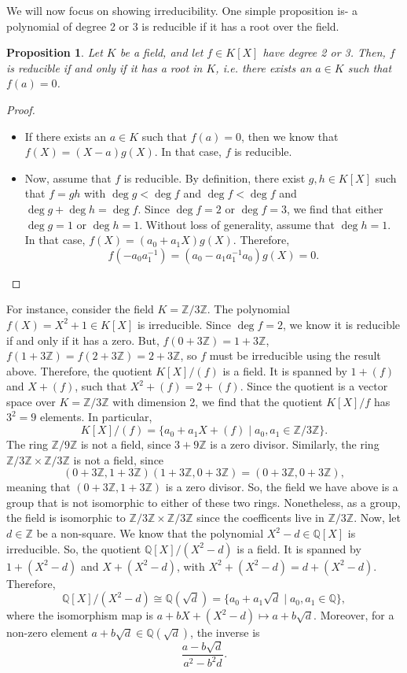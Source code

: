 \documentclass[a4paper, openany]{memoir}
\theoremstyle{definition}
\theoremstyle{plain}
\newtheorem{proposition}[definition]{Proposition}
\begin{document}
We will now focus on showing irreducibility. One simple proposition is- a polynomial of degree 2 or 3 is reducible if it has a root over the field.
\begin{proposition}
Let $K$ be a field, and let $f \in K[X]$ have degree 2 or 3. Then, $f$ is reducible if and only if it has a root in $K$, i.e. there exists an $a \in K$ such that $f(a) = 0$.
\end{proposition}
\begin{proof}
\hspace*{0pt}
\begin{itemize}
    \item If there exists an $a \in K$ such that $f(a) = 0$, then we know that $f(X) = (X - a)g(X)$. In that case, $f$ is reducible.
    
    \item Now, assume that $f$ is reducible. By definition, there exist $g, h \in K[X]$ such that $f = gh$ with $\deg g < \deg f$ and $\deg f < \deg f$ and $\deg g + \deg h = \deg f$. Since $\deg f = 2$ or $\deg f = 3$, we find that either $\deg g = 1$ or $\deg h = 1$. Without loss of generality, assume that $\deg h = 1$. In that case, $f(X) = (a_0 + a_1X)g(X)$. Therefore,
    \[f(-a_0a_1^{-1}) = (a_0 - a_1a_1^{-1}a_0) g(X) = 0.\]
\end{itemize}
\end{proof}
\noindent For instance, consider the field $K = \mathbb{Z}/3 \mathbb{Z}$. The polynomial $f(X) = X^2 + 1 \in K[X]$ is irreducible. Since $\deg f = 2$, we know it is reducible if and only if it has a zero. But, $f(0 + 3\mathbb{Z}) = 1 + 3\mathbb{Z}$, $f(1 + 3\mathbb{Z}) = f(2 + 3\mathbb{Z}) = 2 + 3\mathbb{Z}$, so $f$ must be irreducible using the result above. Therefore, the quotient $K[X]/(f)$ is a field. It is spanned by $1 + (f)$ and $X + (f)$, such that $X^2 + (f) = 2 + (f)$. Since the quotient is a vector space over $K = \mathbb{Z}/3 \mathbb{Z}$ with dimension 2, we find that the quotient $K[X]/f$ has $3^2 = 9$ elements. In particular,
\[K[X]/(f) = \{a_0 + a_1X + (f) \mid a_0, a_1 \in \mathbb{Z}/3 \mathbb{Z}\}.\]
The ring $\mathbb{Z}/9 \mathbb{Z}$ is not a field, since $3 + 9\mathbb{Z}$ is a zero divisor. Similarly, the ring $\mathbb{Z}/3 \mathbb{Z} \times \mathbb{Z}/3 \mathbb{Z}$ is not a field, since 
\[(0 + 3 \mathbb{Z}, 1 + 3\mathbb{Z})(1 + 3 \mathbb{Z}, 0 + 3\mathbb{Z}) = (0 + 3\mathbb{Z}, 0 + 3\mathbb{Z}),\]
meaning that $(0 + 3 \mathbb{Z}, 1 + 3\mathbb{Z})$ is a zero divisor. So, the field we have above is a group that is not isomorphic to either of these two rings. Nonetheless, as a group, the field is isomorphic to $\mathbb{Z}/3 \mathbb{Z} \times \mathbb{Z}/3 \mathbb{Z}$ since the coefficents live in $\mathbb{Z}/3 \mathbb{Z}$. Now, let $d \in \mathbb{Z}$ be a non-square. We know that the polynomial $X^2 - d \in \mathbb{Q}[X]$ is irreducible. So, the quotient $\mathbb{Q}[X]/(X^2 - d)$ is a field. It is spanned by $1 + (X^2 - d)$ and $X + (X^2 - d)$, with $X^2 + (X^2 - d) = d + (X^2 - d)$. Therefore,
\[\mathbb{Q}[X]/(X^2 - d) \cong \mathbb{Q}(\sqrt{d}) = \{a_0 + a_1 \sqrt{d} \mid a_0, a_1 \in \mathbb{Q}\},\]
where the isomorphism map is $a + bX + (X^2 - d) \mapsto a + b\sqrt{d}$. Moreover, for a non-zero element $a + b\sqrt{d} \in \mathbb{Q}(\sqrt{d})$, the inverse is
\[\frac{a - b\sqrt{d}}{a^2 - b^2d}.\]
\end{document}
